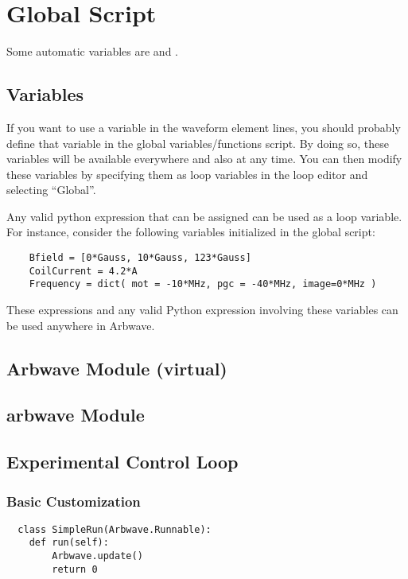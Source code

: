 \thispagestyle{fancy}
\pagestyle{fancy}
\section{Global Script}
    Some automatic variables are  and .

  \subsection{Variables} \label{script:variables}
    If you want to use a variable in the waveform element lines, you should
    probably define that variable in the global variables/functions script.  By
    doing so, these variables will be available everywhere and also at any time.
    You can then modify these variables by specifying them as loop variables in
    the loop editor and selecting ``Global''.

    Any valid python expression that can be assigned can be used as a loop
    variable.  For instance, consider the following variables initialized in the
    global script:

    \begin{verbatim}
    Bfield = [0*Gauss, 10*Gauss, 123*Gauss]
    CoilCurrent = 4.2*A
    Frequency = dict( mot = -10*MHz, pgc = -40*MHz, image=0*MHz )
    \end{verbatim}

    These expressions and any valid Python expression involving these variables
    can be used anywhere in Arbwave.

  \subsection{\textbf{Arbwave} Module (virtual)}
  \subsection{\textbf{arbwave} Module}

  \subsection{Experimental Control Loop}
  \subsubsection{Basic Customization}

  \begin{lstlisting}
  class SimpleRun(Arbwave.Runnable):
  	def run(self):
  		Arbwave.update()
  		return 0
  \end{lstlisting}


